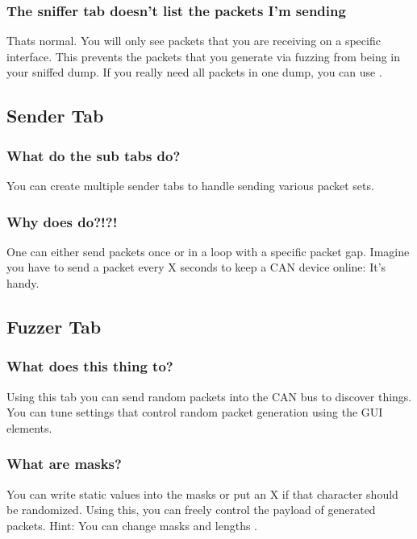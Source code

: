 \documentclass[letterpaper,10pt,english]{sphinxmanual}
\begin{document}
\subsubsection{The sniffer tab doesn’t list the packets I’m sending}
\label{\detokenize{manual.sniffertab:the-sniffer-tab-doesn-t-list-the-packets-i-m-sending}}
Thats normal. You will only see packets that you are receiving on a
specific interface. This prevents the packets that you generate via
fuzzing from being in your sniffed dump. If you really need all
packets in one dump, you can use .


\subsection{Sender Tab}
\label{\detokenize{manual.sendertab:sender-tab}}\label{\detokenize{manual.sendertab::doc}}

\subsubsection{What do the sub tabs do?}
\label{\detokenize{manual.sendertab:what-do-the-sub-tabs-do}}
You can create multiple sender tabs to handle sending various packet
sets.


\subsubsection{Why does  do?!?!}
\label{\detokenize{manual.sendertab:why-does-loop-do}}
One can either send packets once or in a loop with a specific packet gap.
Imagine you have to send a packet every X seconds to keep a CAN device
online: It’s handy.


\subsection{Fuzzer Tab}
\label{\detokenize{manual.fuzzertab:fuzzer-tab}}\label{\detokenize{manual.fuzzertab::doc}}

\subsubsection{What does this thing to?}
\label{\detokenize{manual.fuzzertab:what-does-this-thing-to}}
Using this tab you can send random packets into the CAN bus to discover
things. You can tune settings that control random packet generation
using the GUI elements.


\subsubsection{What are masks?}
\label{\detokenize{manual.fuzzertab:what-are-masks}}
You can write static values into the masks or put an X if that character
should be randomized. Using this, you can freely control the payload
of generated packets.
Hint: You can change masks and lengths .
\end{document}
